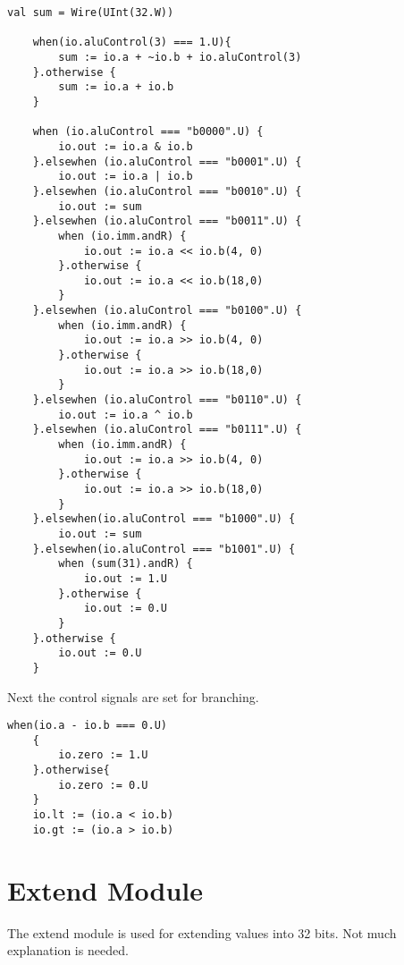 \documentclass[12pt, letterpaper]{report}
\begin{document}
\begin{lstlisting}[style=scala]
   val sum = Wire(UInt(32.W))

    when(io.aluControl(3) === 1.U){
        sum := io.a + ~io.b + io.aluControl(3)
    }.otherwise {
        sum := io.a + io.b
    }
    
    when (io.aluControl === "b0000".U) {
        io.out := io.a & io.b
    }.elsewhen (io.aluControl === "b0001".U) {
        io.out := io.a | io.b
    }.elsewhen (io.aluControl === "b0010".U) {
        io.out := sum
    }.elsewhen (io.aluControl === "b0011".U) {
        when (io.imm.andR) {
            io.out := io.a << io.b(4, 0)
        }.otherwise {
            io.out := io.a << io.b(18,0)
        }
    }.elsewhen (io.aluControl === "b0100".U) {
        when (io.imm.andR) {
            io.out := io.a >> io.b(4, 0)
        }.otherwise {
            io.out := io.a >> io.b(18,0)
        }
    }.elsewhen (io.aluControl === "b0110".U) {
        io.out := io.a ^ io.b
    }.elsewhen (io.aluControl === "b0111".U) {
        when (io.imm.andR) {
            io.out := io.a >> io.b(4, 0)
        }.otherwise {
            io.out := io.a >> io.b(18,0)
        }
    }.elsewhen(io.aluControl === "b1000".U) {
        io.out := sum
    }.elsewhen(io.aluControl === "b1001".U) {
        when (sum(31).andR) {
            io.out := 1.U
        }.otherwise {
            io.out := 0.U
        }
    }.otherwise {
        io.out := 0.U
    }
\end{lstlisting}

Next the control signals are set for branching.

\begin{lstlisting}[style=scala]
   when(io.a - io.b === 0.U)
    {
        io.zero := 1.U
    }.otherwise{
        io.zero := 0.U
    }
    io.lt := (io.a < io.b)
    io.gt := (io.a > io.b)
\end{lstlisting}




\section{Extend Module}
The extend module is used for extending values into 32 bits. Not much explanation is needed. 
\end{document}
